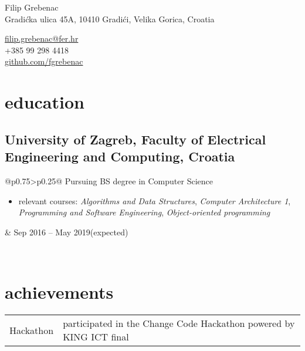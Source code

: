 \documentclass[a4paper]{article}
\makeatletter
\newlength{\tablewidth}
\newenvironment{period}[2]{%
\newcommand{\sarma}{#2}%
\setlength{\tablewidth}{\linewidth}
\addtolength{\tablewidth}{-2\tabcolsep}
\begin{tabular}{@{}p{0.75\tablewidth}>{\raggedleft\arraybackslash}p{0.25\tablewidth}@{}}%
#1 \newline
\begin{itemize}
}{%
\end{itemize} & \sarma \\%
\end{tabular}\\
}
\newenvironment{skills}{%
\setlength{\tablewidth}{\linewidth}
\addtolength{\tablewidth}{-2\tabcolsep}
\begin{tabular}{@{}p{0.15\tablewidth}p{0.85\tablewidth}@{}}
}{%
\end{tabular}
}
\makeatother
\begin{document}
\fontfamily{\sfdefault}
\selectfont

\begin{minipage}{.5\textwidth}
\LARGE{Filip Grebenac}\\
\normalsize{Gradićka ulica 45A, 10410 Gradići, Velika Gorica, Croatia}
\end{minipage}%
\begin{minipage}{.5\textwidth}
\raggedleft
\href{mailto:ime.prezime@gmail.com}{filip.grebenac@fer.hr} \\
+385 99 298 4418 \\
\href{https://github.com/iprezime}{github.com/fgrebenac}
\end{minipage}

\vspace{1em}


\section{education}
\subsection{University of Zagreb, Faculty of Electrical Engineering and Computing, Croatia}
\begin{period}{Pursuing BS degree in Computer Science}{Sep 2016 -- May 2019\linebreak(expected)}
    \item relevant courses:
        \textit{Algorithms and Data Structures},
        \textit{Computer Architecture 1},
        \textit{Programming and Software Engineering},
        \textit{Object-oriented programming}
\end{period}

\section{achievements}
\begin{skills}
    Hackathon   &   participated in the Change Code Hackathon powered by KING ICT final 
    
\end{skills}
\end{document}
